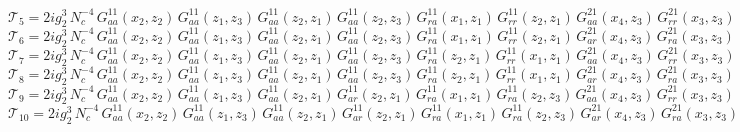 \documentclass{article}
\begin{document}
\begin{equation*}
\mathcal{T}_{5} = 2 i g_{2}^{3}\,N_c^{-4}\,G^{11}_{aa}\left(x_2,z_{2}\right) \, G^{11}_{aa}\left(z_{1},z_{3}\right) \, G^{11}_{aa}\left(z_{2},z_{1}\right) \, G^{11}_{aa}\left(z_{2},z_{3}\right) \, G^{11}_{ra}\left(x_1,z_{1}\right) \, G^{11}_{rr}\left(z_{2},z_{1}\right) \, G^{21}_{aa}\left(x_4,z_{3}\right) \, G^{21}_{rr}\left(x_3,z_{3}\right)
\end{equation*}
\begin{equation*}
\mathcal{T}_{6} = 2 i g_{2}^{3}\,N_c^{-4}\,G^{11}_{aa}\left(x_2,z_{2}\right) \, G^{11}_{aa}\left(z_{1},z_{3}\right) \, G^{11}_{aa}\left(z_{2},z_{1}\right) \, G^{11}_{aa}\left(z_{2},z_{3}\right) \, G^{11}_{ra}\left(x_1,z_{1}\right) \, G^{11}_{rr}\left(z_{2},z_{1}\right) \, G^{21}_{ar}\left(x_4,z_{3}\right) \, G^{21}_{ra}\left(x_3,z_{3}\right)
\end{equation*}
\begin{equation*}
\mathcal{T}_{7} = 2 i g_{2}^{3}\,N_c^{-4}\,G^{11}_{aa}\left(x_2,z_{2}\right) \, G^{11}_{aa}\left(z_{1},z_{3}\right) \, G^{11}_{aa}\left(z_{2},z_{1}\right) \, G^{11}_{aa}\left(z_{2},z_{3}\right) \, G^{11}_{ra}\left(z_{2},z_{1}\right) \, G^{11}_{rr}\left(x_1,z_{1}\right) \, G^{21}_{aa}\left(x_4,z_{3}\right) \, G^{21}_{rr}\left(x_3,z_{3}\right)
\end{equation*}
\begin{equation*}
\mathcal{T}_{8} = 2 i g_{2}^{3}\,N_c^{-4}\,G^{11}_{aa}\left(x_2,z_{2}\right) \, G^{11}_{aa}\left(z_{1},z_{3}\right) \, G^{11}_{aa}\left(z_{2},z_{1}\right) \, G^{11}_{aa}\left(z_{2},z_{3}\right) \, G^{11}_{ra}\left(z_{2},z_{1}\right) \, G^{11}_{rr}\left(x_1,z_{1}\right) \, G^{21}_{ar}\left(x_4,z_{3}\right) \, G^{21}_{ra}\left(x_3,z_{3}\right)
\end{equation*}
\begin{equation*}
\mathcal{T}_{9} = 2 i g_{2}^{3}\,N_c^{-4}\,G^{11}_{aa}\left(x_2,z_{2}\right) \, G^{11}_{aa}\left(z_{1},z_{3}\right) \, G^{11}_{aa}\left(z_{2},z_{1}\right) \, G^{11}_{ar}\left(z_{2},z_{1}\right) \, G^{11}_{ra}\left(x_1,z_{1}\right) \, G^{11}_{ra}\left(z_{2},z_{3}\right) \, G^{21}_{aa}\left(x_4,z_{3}\right) \, G^{21}_{rr}\left(x_3,z_{3}\right)
\end{equation*}
\begin{equation*}
\mathcal{T}_{10} = 2 i g_{2}^{3}\,N_c^{-4}\,G^{11}_{aa}\left(x_2,z_{2}\right) \, G^{11}_{aa}\left(z_{1},z_{3}\right) \, G^{11}_{aa}\left(z_{2},z_{1}\right) \, G^{11}_{ar}\left(z_{2},z_{1}\right) \, G^{11}_{ra}\left(x_1,z_{1}\right) \, G^{11}_{ra}\left(z_{2},z_{3}\right) \, G^{21}_{ar}\left(x_4,z_{3}\right) \, G^{21}_{ra}\left(x_3,z_{3}\right)
\end{equation*}
\end{document}
